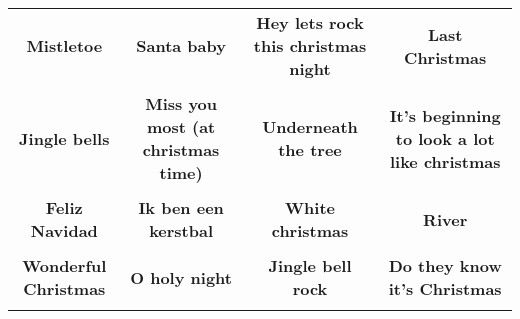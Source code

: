\documentclass[12pt]{article} \usepackage{eso-pic, graphicx}
\newcommand{\background}[1]{%
\AddToShipoutPictureBG*{\texttt{[image: \#1]}}
}
\begin{document}
\tabcolsep=30.2pt \renewcommand{\arraystretch}{4.5}   \vspace*{4.3cm} \begin{center}  \begin{tabular}{c c c c}
\parbox{3cm}{\centering \textbf{Mistletoe}}& 
\parbox{3cm}{\centering \textbf{Santa baby}}& 
\parbox{3cm}{\centering \textbf{Hey lets rock this christmas night}}& 
\parbox{3cm}{\centering \textbf{Last Christmas}}\\ \\ 
\parbox{3cm}{\centering \textbf{Jingle bells}}& 
\parbox{3cm}{\centering \textbf{Miss you most (at christmas time)}}& 
\parbox{3cm}{\centering \textbf{Underneath the tree}}& 
\parbox{3cm}{\centering \textbf{It’s beginning to look a lot like christmas}}\\ \\ 
\parbox{3cm}{\centering \textbf{Feliz Navidad}}& 
\parbox{3cm}{\centering \textbf{Ik ben een kerstbal}}& 
\parbox{3cm}{\centering \textbf{White christmas}}& 
\parbox{3cm}{\centering \textbf{River}}\\ \\ 
\parbox{3cm}{\centering \textbf{Wonderful Christmas}}& 
\parbox{3cm}{\centering \textbf{O holy night}}& 
\parbox{3cm}{\centering \textbf{Jingle bell rock}}& 
\parbox{3cm}{\centering \textbf{Do they know it's Christmas}}\\ \\ 
\end{tabular} \background{discobingo.pdf} \end{center} 
\end{document}
